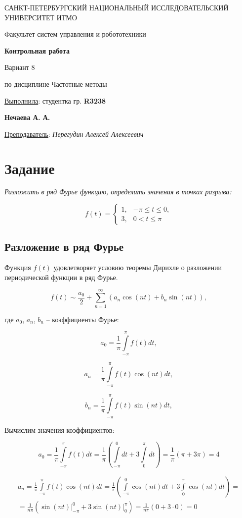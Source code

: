 \documentclass[a5paper, 10pt]{article}
\theoremstyle{definition}
\theoremstyle{plain}
\theoremstyle{remark}
\newcommand*{\titlePage}{
	\thispagestyle{title}
	\begingroup
	\begin{center}
		\vspace*{6ex}
		
		{\small
			САНКТ-ПЕТЕРБУРГСКИЙ НАЦИОНАЛЬНЫЙ ИССЛЕДОВАТЕЛЬСКИЙ УНИВЕРСИТЕТ ИТМО	
		}
		
		\vspace*{2ex}
		
		{\normalsize
			Факультет систем управления и робототехники
		}
		
		\vspace*{15ex}
		
		{\Large \bfseries 
			Контрольная работа
		}
\vspace*{2ex}
	{\Large \bfseries 
			
Вариант 8
		}
\vspace*{2ex}
		
		{\normalsize
			по дисциплине Частотные методы
		}

	\end{center}
	\vspace*{20ex}
	\begin{flushright}
		{\large 
			\underline{Выполнила}: студентка гр. \textbf{R3238}\\
			\begin{flushright}
				\textbf{Нечаева А. А.}\\
			\end{flushright}
		}
		
		\vspace*{5ex}
		
		{\large 
			\underline{Преподаватель}: \textit{Перегудин Алексей Алексеевич}
		}
	\end{flushright}	
	\newpage
	\setcounter{page}{1}
	\endgroup}
\begin{document}
	\titlePage
	\pagestyle{style}
\newpage

\section{Задание}

\textit{Разложить в ряд Фурье функцию, определить значения в точках разрыва:}

\begin{equation}
f(t) = 
\begin{cases}
1, & -\pi \leq t \leq 0,\\
3, & 0 < t \leq \pi
\end{cases}
\end{equation}

\subsection{Разложение в ряд Фурье}

Функция $f(t)$ удовлетворяет условию теоремы Дирихле о разложении периодической функции в ряд Фурье.

\begin{equation}
f(t) \sim \frac{a_0}{2} + \sum \limits_{n=1}^{\infty} \left( a_n \cos (nt) + b_n \sin (nt) \right),
\end{equation}

где $a_0$, $a_n$, $b_n$ -- коэффициенты Фурье:

\begin{equation}
a_0 = \frac{1}{\pi} \int \limits_{-\pi}^{\pi} f(t) dt,
\end{equation}

\begin{equation}
a_n = \frac{1}{\pi} \int \limits_{-\pi}^{\pi} f(t) \cos (nt) dt,
\end{equation}


\begin{equation}
b_n = \frac{1}{\pi} \int \limits_{-\pi}^{\pi} f(t) \sin (nt) dt,
\end{equation}

Вычислим значения коэффициентов:

\begin{equation}
a_0 = \frac{1}{\pi} \int \limits_{-\pi}^{\pi} f(t) dt = \frac{1}{\pi} \left( \int \limits_{-\pi}^{0} dt  + 3 \int \limits_{0}^{\pi} dt \right) = \frac{1}{\pi} \left( \pi  + 3 \pi \right) = 4
\end{equation}

\begin{multline}
a_n = \frac{1}{\pi} \int \limits_{-\pi}^{\pi} f(t) \cos (nt) dt = \frac{1}{\pi} \left( \int \limits_{-\pi}^{0} \cos (nt) dt  + 3 \int \limits_{0}^{\pi} \cos (nt) dt \right) = \\ =  \frac{1}{n\pi} \left( \left. \sin (nt) \right|_{-\pi}^{0} + 3 \left. \sin (nt) \right|_{0}^{\pi} \right) = \frac{1}{n\pi} \left( 0 + 3 \cdot 0 \right) = 0
\end{multline}
\end{document}
